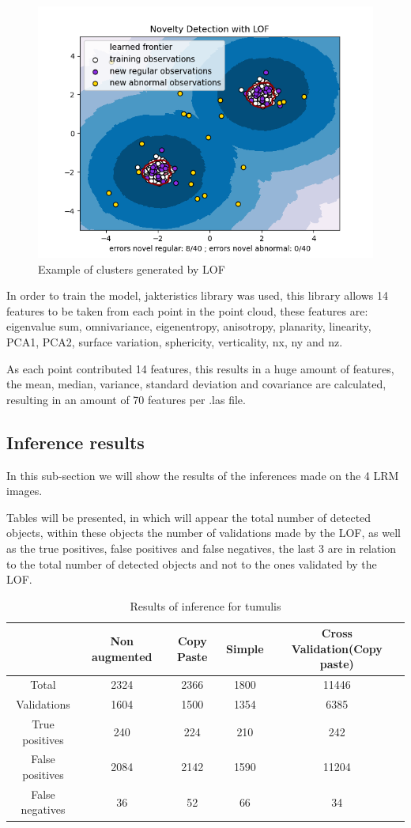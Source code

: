 \begin{figure}[H]
\centering
\includegraphics[]{images/lof_example.png}
\caption{Example of clusters generated by LOF}
\end{figure}

In order to train the model, jakteristics library was used, this library allows 14 features to be taken from each point in the point cloud, these features are: eigenvalue sum, omnivariance, eigenentropy, anisotropy, planarity, linearity, PCA1, PCA2, surface variation, sphericity, verticality, nx, ny and nz.

As each point contributed 14 features, this results in a huge amount of features, the mean, median, variance, standard deviation and covariance are calculated, resulting in an amount of 70 features per .las file.

\subsection{Inference results}
In this sub-section we will show the results of the inferences made on the 4 LRM images.

Tables will be presented, in which will appear the total number of detected objects, within these objects the number of validations made by the LOF, as well as the true positives, false positives and false negatives, the last 3 are in relation to the total number of detected objects and not to the ones validated by the LOF.

\begin{table}[h!]
\centering
\begin{tabular}{|c c c c c|} 
 \hline
  & Non augmented  & Copy Paste & Simple & Cross Validation(Copy paste) \\ [0.5ex] 
 \hline\hline
 Total & 2324 & 2366 & 1800 & 11446 \\ 
 Validations & 1604 & 1500 & 1354 & 6385 \\
 True positives & 240 & 224 & 210 & 242 \\
 False positives & 2084 & 2142 & 1590 & 11204 \\
 False negatives & 36 & 52 & 66 & 34 \\ [1ex] 
 \hline
\end{tabular}
\caption{Results of inference for tumulis}
\end{table}

